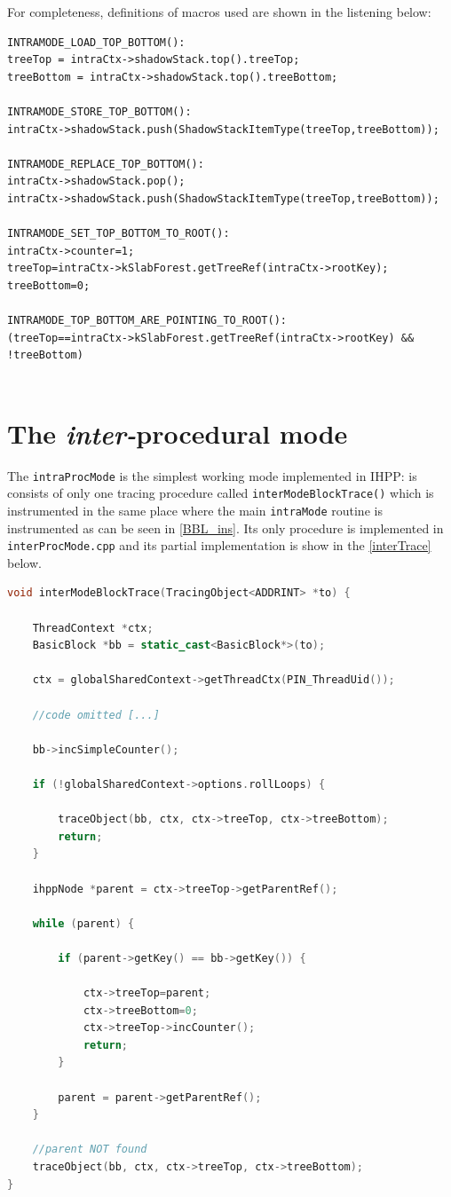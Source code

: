 \documentclass[a4paper,10pt]{report}
\begin{document}
\noindent
For completeness, definitions of macros used are shown in the listening below:

\begin{lstlisting}[caption={partial implementation of \texttt{intraMode\_ret()}}, 
	label=intraMacros, frame=leftline, showstringspaces=false]
INTRAMODE_LOAD_TOP_BOTTOM():
treeTop = intraCtx->shadowStack.top().treeTop;
treeBottom = intraCtx->shadowStack.top().treeBottom; 

INTRAMODE_STORE_TOP_BOTTOM():
intraCtx->shadowStack.push(ShadowStackItemType(treeTop,treeBottom));

INTRAMODE_REPLACE_TOP_BOTTOM():
intraCtx->shadowStack.pop(); 
intraCtx->shadowStack.push(ShadowStackItemType(treeTop,treeBottom));

INTRAMODE_SET_TOP_BOTTOM_TO_ROOT():
intraCtx->counter=1; 
treeTop=intraCtx->kSlabForest.getTreeRef(intraCtx->rootKey); 
treeBottom=0;

INTRAMODE_TOP_BOTTOM_ARE_POINTING_TO_ROOT():	
(treeTop==intraCtx->kSlabForest.getTreeRef(intraCtx->rootKey) && !treeBottom)


\end{lstlisting}

\section{The \emph{inter-}procedural mode}

The \verb|intraProcMode| is the simplest working mode implemented in IHPP:
is consists of only one tracing procedure called \verb|interModeBlockTrace()|
which is instrumented in the same place where the main \verb|intraMode| routine
is instrumented as can be seen in \cref{BBL_ins}. Its only procedure 
is implemented in \verb|interProcMode.cpp| and its partial implementation 
is show in the \cref{interTrace} below.

\begin{lstlisting}[language=C++, 
	caption={partial implementation of \texttt{interModeBlockTrace}}, 
	label=interTrace, frame=leftline, showstringspaces=false]
void interModeBlockTrace(TracingObject<ADDRINT> *to) { 

	ThreadContext *ctx;
	BasicBlock *bb = static_cast<BasicBlock*>(to);

	ctx = globalSharedContext->getThreadCtx(PIN_ThreadUid());

	//code omitted [...]

	bb->incSimpleCounter();

	if (!globalSharedContext->options.rollLoops) {
	
		traceObject(bb, ctx, ctx->treeTop, ctx->treeBottom);
		return;
	}

	ihppNode *parent = ctx->treeTop->getParentRef();

	while (parent) {

		if (parent->getKey() == bb->getKey()) {

			ctx->treeTop=parent;
			ctx->treeBottom=0;
			ctx->treeTop->incCounter();
			return;
		}

		parent = parent->getParentRef();
	}

	//parent NOT found
	traceObject(bb, ctx, ctx->treeTop, ctx->treeBottom);
}
\end{lstlisting}
\end{document}
